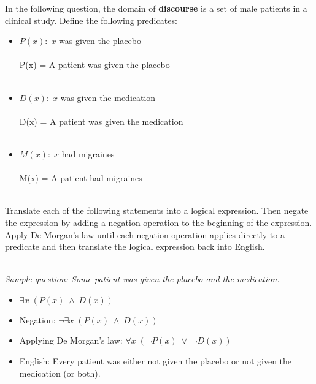 \documentclass{amsart}
\theoremstyle{definition}
\theoremstyle{Exercise}
\theoremstyle{remark}
\theoremstyle{rule}
\numberwithin{equation}{section}
\begin{document}
In the following question, the domain of {\bf discourse} is a set of male patients in a clinical study. Define the following predicates:\\
\begin{itemize}
  \item $P(x):\; x$ was given the placebo\\\\
P(x) = A patient was given the placebo
\\\\
  \item $D(x):\; x$ was given the medication\\\\
D(x) = A patient was given the medication
   \\\\
  \item $M(x): \; x$ had migraines\\\\
M(x) = A patient had migraines
\\\\
\end{itemize}
Translate each of the following statements into a logical expression. Then negate the expression by adding a negation operation to the beginning of the expression. Apply De Morgan's law until each negation operation applies directly to a predicate and then translate the logical expression back into English.\\\\

{\it
Sample question: Some patient was given the placebo and the medication.\\
\begin{itemize}
  \item $\exists x\; (P(x)\; \land \; D(x))$\\
  \item Negation: $\neg \exists x\; (P(x)\; \land \; D(x))$\\
  \item Applying De Morgan's law: $\forall x\; (\neg P(x)\; \lor \; \neg D(x))$\\
  \item English: Every patient was either not given the placebo or not given the medication (or both).\\
\end{itemize}
}
\newpage
\end{document}

